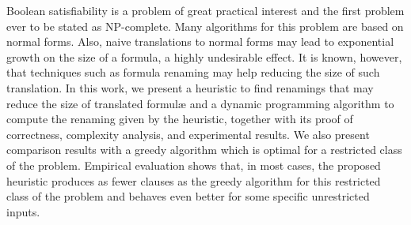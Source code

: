 Boolean satisfiability is a problem of great practical interest and the first problem ever to be stated as NP-complete. Many algorithms for this problem are based on normal forms. Also, naive translations to normal forms may lead to exponential growth on the size of a formula, a highly undesirable effect. It is known, however, that techniques such as formula renaming may help reducing the size of such translation. In this work, we present a heuristic to find renamings that may reduce the size of translated formul\ae \; and a dynamic programming algorithm to compute the renaming given by the heuristic, together with its proof of correctness, complexity analysis, and experimental results. We also present comparison results with a greedy algorithm which is optimal for a restricted class of the problem. Empirical evaluation shows that, in most cases, the proposed heuristic produces as fewer clauses as the greedy algorithm for this restricted class of the problem and behaves even better for some specific unrestricted inputs.
